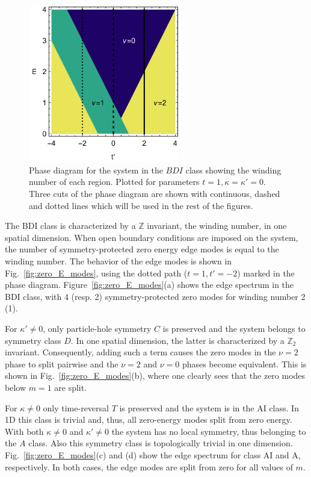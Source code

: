 \documentclass[twocolumn,amsmath,longbibliography,amssymb,superscriptaddress]{revtex4-1}
\begin{document}
\begin{figure}[t]
	\centering
	\includegraphics[width=66mm]{fig1.pdf}
	\caption{Phase diagram for the system in the $BDI$ class showing the winding number of each region. Plotted for parameters $t = 1,\kappa =\kappa'=0$. Three cuts of the phase diagram are shown with continuous, dashed and dotted lines which will be used in the rest of the figures.}
\label{fig:bdi_phase_diagram}
\end{figure}

The BDI class  is characterized by a $\mathbb{Z}$ invariant, the winding number,  in one spatial dimension.
When open boundary conditions are imposed on the system, the number of symmetry-protected zero energy edge modes is equal to the winding number. 
The behavior of the  edge modes  is  shown in Fig.~\ref{fig:zero_E_modes}, using the dotted path ($t=1,t'=-2$) marked in the phase diagram. 
Figure~\ref{fig:zero_E_modes}(a) shows the edge spectrum in the BDI class, with 4 (resp. 2) symmetry-protected zero modes for winding number 2 (1). 

For $\kappa' \neq 0$, only particle-hole symmetry $C$ is preserved and the system belongs to symmetry class $D$. 
In one spatial dimension, the latter is characterized by a $\mathbb{Z}_2$ invariant.  
Consequently, adding such a term causes the zero modes in the $\nu=2$ phase to split  pairwise and the $\nu = 2$ and $\nu=0$ phases become equivalent. 
This is shown in Fig.~\ref{fig:zero_E_modes}(b), where one clearly sees that the zero modes below $m=1$ are split. 

For $\kappa \neq 0$ only time-reversal $T$ is preserved and the system is in the AI class. 
In 1D this class is trivial and, thus,  all zero-energy modes split from zero energy. 
With both $\kappa \neq 0$ and $\kappa' \neq0$ the system has no local symmetry, thus belonging to the $A$ class.  
Also this symmetry class is topologically trivial in one dimension. 
Fig.~\ref{fig:zero_E_modes}(c) and (d) show the edge spectrum for class AI and A, respectively. In both cases, the edge modes are split from zero for all values of $m$.
\end{document}
